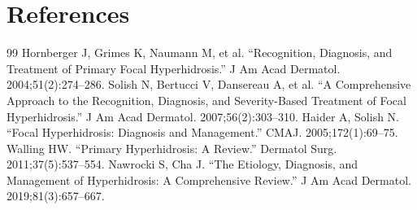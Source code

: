 \section*{References}
\begin{thebibliography}{99}
 Hornberger J, Grimes K, Naumann M, et al. ``Recognition, Diagnosis, and Treatment of Primary Focal Hyperhidrosis.'' J Am Acad Dermatol. 2004;51(2):274--286.
 Solish N, Bertucci V, Dansereau A, et al. ``A Comprehensive Approach to the Recognition, Diagnosis, and Severity-Based Treatment of Focal Hyperhidrosis.'' J Am Acad Dermatol. 2007;56(2):303--310.
 Haider A, Solish N. ``Focal Hyperhidrosis: Diagnosis and Management.'' CMAJ. 2005;172(1):69--75.
 Walling HW. ``Primary Hyperhidrosis: A Review.'' Dermatol Surg. 2011;37(5):537--554.
 Nawrocki S, Cha J. ``The Etiology, Diagnosis, and Management of Hyperhidrosis: A Comprehensive Review.'' J Am Acad Dermatol. 2019;81(3):657--667.
\end{thebibliography}
